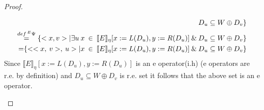 \documentclass{article}
\begin{document}
\begin{proof}
\begin{enumerate}
\begin{itemize}
\begin{equation*}
\begin{split}
					D_u \subseteq W \oplus D_v\}
					\\\stackrel{def \prescript{E}{}{\Psi}{}{}}{=}
					\{<x, v> | \exists u \: 	x\:\in\:
					\llbracket E \rrbracket_\eta
					{[x := L(D_u), y:= R(D_u)]}
					\:\&\: 	D_u \subseteq W \oplus D_v\}	
					\\{=}
					\{<<x,\:v>,\:u> | x \:\in\:
					\llbracket E \rrbracket_\eta
					{[x := L(D_u), y:= R(D_u)]}
					\:\&\: 	D_u \subseteq W \oplus D_v\}
				\end{split}
				\end{equation*}
				Since $\llbracket E \rrbracket_\eta
				{[x := L(D_u), y:= R(D_u)]}$ is an e operator(i.h)
				(e operators are r.e. by definition) and
				$D_u \subseteq W \oplus D_v$ is r.e. set
				it follows that the above set is an e operator.
				\end{itemize}
		\end{enumerate}
	\end{proof}
	
\end{document}
